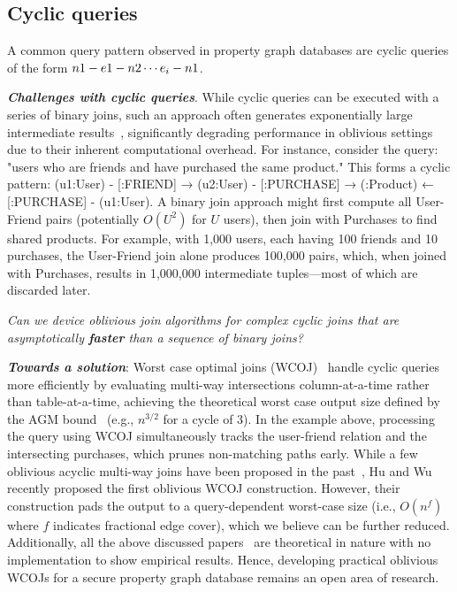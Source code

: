 \vspace{-0.7em}
\subsection{Cyclic queries}
\label{sub:cyclic}

A common query pattern observed in property graph databases are cyclic
queries of the form $n1 - e1 - n2 \- \cdots e_i - n1$.

\noindent\textbf{\textit{Challenges with cyclic queries}}. While cyclic queries can be 
executed with a 
series of binary joins, such an approach often generates 
exponentially large intermediate results~\cite{ngo2014skew}, significantly 
degrading performance in oblivious settings due to their inherent computational overhead.
For instance, consider the query: "users who are friends and have purchased the same product." This forms a cyclic pattern: (u1:User) - [:FRIEND] → (u2:User) - [:PURCHASE] → (:Product) ← [:PURCHASE] - (u1:User). A 
binary join approach might first compute all User-Friend pairs (potentially $O(U^2)$ for $U$ users), then join with Purchases to find shared products. For example, with 1,000 users, each having 100 friends and 10 purchases, the User-Friend join alone produces 100,000 pairs, which, when joined with Purchases, results in 1,000,000 intermediate tuples—most of which are discarded later.

\begin{tcolorbox}[colback=gray!7!white,coltitle=black,colframe=orange!50!white,title=\centering \textbf{Research question 4}]
\centering
\emph{Can we device oblivious join algorithms for complex cyclic joins that are
asymptotically \textbf{faster} than a sequence of binary joins?}
\end{tcolorbox}

\noindent\textit{\textbf{Towards a solution}}:
Worst case optimal joins (WCOJ)~\cite{ngo2018worst} handle cyclic queries more efficiently by evaluating multi-way intersections column-at-a-time rather than table-at-a-time, achieving the theoretical worst case output size defined by the AGM bound~\cite{atserias2008size} (e.g., $n^{3/2}$ for a cycle of 3). In the example above, processing the query using WCOJ 
simultaneously tracks the user-friend relation and the intersecting purchases, which prunes non-matching paths early. While a few oblivious acyclic
multi-way joins have been proposed in the past~\cite{arasu2013oblivious, chu2021differentially}, Hu and Wu~\cite{hu2025optimal} recently
proposed the first oblivious WCOJ construction. However, their construction pads the output to a query-dependent worst-case
size (i.e., $O(n^f)$ where $f$ indicates fractional edge cover), which we believe
can be further reduced. Additionally, all the above discussed papers~\cite{arasu2013oblivious, chu2021differentially,hu2025optimal} are theoretical in nature with no implementation to show empirical results. Hence, developing practical oblivious
WCOJs for a secure property graph database remains an open area of research. 

